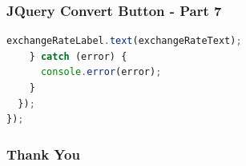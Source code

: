 \documentclass[aspectratio=169, table]{beamer}
\begin{document}
\begin{frame}[fragile]
    \frametitle{JQuery Convert Button - Part 7}
    \begin{lstlisting}[language=JavaScript]
      exchangeRateLabel.text(exchangeRateText);
    } catch (error) {
      console.error(error);
    }
  });
});
    \end{lstlisting}
\end{frame}

\begin{frame4}
    \frametitle{Thank You}
\end{frame4}
\end{document}
